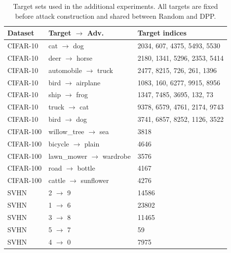 \begin{table}[t]
\centering
\caption{
Target sets used in the additional experiments. All targets are fixed
before attack construction and shared between Random and DPP.
}
\label{tab:additional-target-indices}
\small
\setlength{\tabcolsep}{5pt}
\renewcommand{\arraystretch}{1.08}
\begin{tabular}{lll}
\toprule
\textbf{Dataset} &
\textbf{Target $\rightarrow$ Adv.} &
\textbf{Target indices} \\
\midrule
CIFAR-10 & cat $\rightarrow$ dog
    & 2034, 607, 4375, 5493, 5530 \\
CIFAR-10 & deer $\rightarrow$ horse
    & 2180, 1341, 5296, 2353, 5414 \\
CIFAR-10 & automobile $\rightarrow$ truck
    & 2477, 8215, 726, 261, 1396 \\
CIFAR-10 & bird $\rightarrow$ airplane
    & 1083, 160, 6277, 9915, 8956 \\
CIFAR-10 & ship $\rightarrow$ frog
    & 1347, 7485, 3695, 132, 73 \\
CIFAR-10 & truck $\rightarrow$ cat
    & 9378, 6579, 4761, 2174, 9743 \\
CIFAR-10 & bird $\rightarrow$ dog
    & 3741, 6857, 8252, 1126, 3522 \\
\midrule
CIFAR-100 & willow\_tree $\rightarrow$ sea
    & 3818 \\
CIFAR-100 & bicycle $\rightarrow$ plain
    & 4646 \\
CIFAR-100 & lawn\_mower $\rightarrow$ wardrobe
    & 3576 \\
CIFAR-100 & road $\rightarrow$ bottle
    & 4167 \\
CIFAR-100 & cattle $\rightarrow$ sunflower
    & 4276 \\
\midrule
SVHN & 2 $\rightarrow$ 9 & 14586 \\
SVHN & 1 $\rightarrow$ 6 & 23802 \\
SVHN & 3 $\rightarrow$ 8 & 11465 \\
SVHN & 5 $\rightarrow$ 7 & 59 \\
SVHN & 4 $\rightarrow$ 0 & 7975 \\
\bottomrule
\end{tabular}
\end{table}